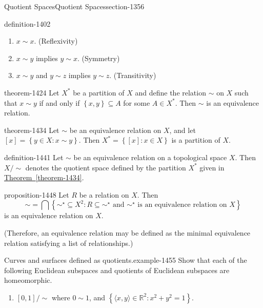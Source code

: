 \documentclass[oneside,10pt,]{article}
\newcommand{\tuple}[1]{\langle #1 \rangle}
\newcommand{\mb}{\mathbb}
\newcommand{\setBuilder}[2]{\left\{#1:#2\right\}}
\newcommand{\setList}[1]{\left\{#1\right\}}
\begin{document}
\begin{sectionptx}{Quotient Spaces}{}{Quotient Spaces}{}{}{section-1356}
\begin{definition}{}{definition-1402}
\leavevmode%
\begin{enumerate}
\item\hypertarget{li-1415}{}\(x\sim x\). (Reflexivity)%
\item\hypertarget{li-1417}{}\(x\sim y\) implies \(y\sim x\). (Symmetry)%
\item\hypertarget{li-1420}{}\(x\sim y\) and \(y\sim z\) implies \(y\sim z\). (Transitivity)%
\end{enumerate}
\end{definition}
\begin{theorem}{}{}{theorem-1424}%
\hypertarget{p-1425}{}%
Let \(X^*\) be a partition of \(X\) and define the relation \(\sim\) on \(X\) such that \(x\sim y\) if and only if \(\setList{x,y}\subseteq A\) for some \(A\in X^*\). Then \(\sim\) is an equivalence relation.%
\end{theorem}
\begin{theorem}{}{}{theorem-1434}%
\hypertarget{p-1435}{}%
Let \(\sim\) be an equivalence relation on \(X\), and let \([x]=\setBuilder{y\in X}{x\sim y}\). Then \(X^*=\setBuilder{[x]}{x\in X}\) is a partition of \(X\).%
\end{theorem}
\begin{definition}{}{definition-1441}%
\hypertarget{p-1442}{}%
Let \(\sim\) be an equivalence relation on a topological space \(X\). Then \(X/\sim\) denotes the quotient space defined by the partition \(X^*\) given in \hyperref[theorem-1434]{Theorem~\ref{theorem-1434}}.%
\end{definition}
\begin{proposition}{}{}{proposition-1448}%
\hypertarget{p-1449}{}%
Let \(R\) be a relation on \(X\). Then%
\begin{equation*}
\sim=\bigcap\setBuilder{\sim^\star\subseteq X^2}{R\subseteq\sim^\star\text{ and }\sim^\star
\text{ is an equivalence relation on }X}
\end{equation*}
is an equivalence relation on \(X\).%
\par
\hypertarget{p-1454}{}%
(Therefore, an equivalence relation may be defined as the minimal equivalence relation satisfying a list of relationships.)%
\end{proposition}
\begin{example}{Curves and surfaces defined as quotients.}{example-1455}%
\hypertarget{p-1457}{}%
Show that each of the following Euclidean subspaces and quotients of Euclidean subspaces are homeomorphic.%
\leavevmode%
\begin{enumerate}
\item\hypertarget{li-1459}{}\([0,1]/\sim\) where \(0\sim 1\), and \(\setBuilder{\tuple{x,y}\in\mb R^2}{x^2+y^2=1}\).%

\end{enumerate}
\end{example}
\end{sectionptx}
\end{document}
